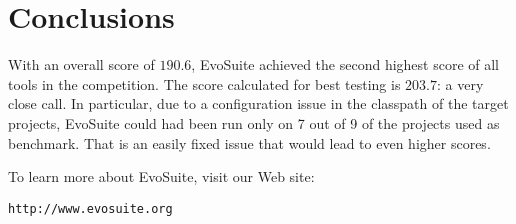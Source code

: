 \documentclass[10pt,conference,compsocconf]{IEEEtran}
\newcommand{\EVOSUITE}{{\sc EvoSuite}\xspace}
\begin{document}
\section{Conclusions}

With an overall score of $190.6$, \EVOSUITE achieved the second highest score of all tools in
the competition. The score calculated for best testing is $203.7$:  a very close
call. 
In particular, due to a configuration issue in the classpath of the target projects,
\EVOSUITE could had been run only on 7 out of 9 of the projects used as benchmark.
That is an easily fixed issue that would lead to even higher scores. 


To learn more about \EVOSUITE, visit our Web site:
\begin{center}
\texttt{http://www.evosuite.org}
\end{center}






\def\IEEEbibitemsep{6pt}



\end{document}
